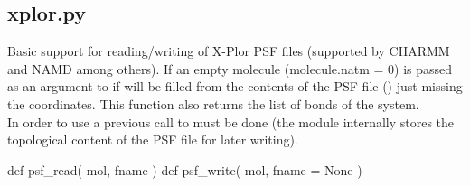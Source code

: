 \normalsize
\subsection[xplor]{xplor.py}
Basic support for reading/writing of X-Plor PSF files (supported by CHARMM and NAMD among others).
If an empty molecule (molecule.natm = 0) is passed as an argument to  if will be filled from the contents of the PSF file () just missing the coordinates. This function also returns the list of bonds of the system.\\
In order to use  a previous call to  must be done (the module internally stores the topological content of the PSF file for later writing).
\begin{pyglist}[language=python,fvset={frame=single}]
def psf_read( mol, fname )
def psf_write( mol, fname = None )
\end{pyglist}
